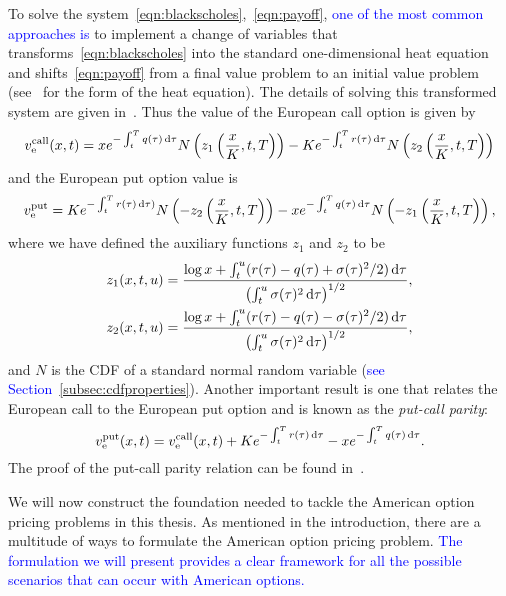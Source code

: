 To solve the system~\eqref{eqn:blackscholes},~\eqref{eqn:payoff}, \textcolor{blue}{one of the most common approaches is} to implement a change of variables that transforms~\eqref{eqn:blackscholes} into the standard one-dimensional heat equation and shifts~\eqref{eqn:payoff} from a final value problem to an initial value problem (see~\cite{cannon1984one} for the form of the heat equation).
The details of solving this transformed system are given in~\cite{Wilmott1995}. Thus the value of the European call option is given by
	\begin{equation}
		\label{eqn:EUcall}
			v_{\text{e}}^{\text{call}}(x,t) = xe^{-\int_t^T q(\tau) \, \mathrm d\tau} N\left(z_1\left( \frac{x}{K}, t, T \right)\right) - K e^{-\int_t^T r(\tau) \, \mathrm d\tau} N\left(z_2\left( \frac{x}{K}, t, T \right)\right)
		\end{equation}
and the European put option value is
	\begin{equation}
		\label{eqn:EUput}
		v_{\text{e}}^{\text{put}} = K e^{-\int_t^T r(\tau) \, \mathrm d\tau) } N\left(-z_2\left( \frac{x}{K}, t, T \right)\right) - xe^{-\int_t^T q(\tau) \, \mathrm d\tau} N\left(-z_1\left( \frac{x}{K}, t, T \right)\right),
	\end{equation}
where we have defined the auxiliary functions $z_1$ and $z_2$ to be
	\begin{align}
		z_1(x,t,u) & = \frac{\log x + \int_t^u (r(\tau) - q(\tau) + \sigma(\tau)^2/2) \, \mathrm d\tau}{\left(\int_t^u \sigma(\tau)^2 \, \mathrm d\tau\right)^{1/2}}, \label{eqn:z1}\\
		z_2(x,t,u) & = \frac{\log x + \int_t^u (r(\tau) - q(\tau) - \sigma(\tau)^2/2) \, \mathrm d\tau}{\left(\int_t^u \sigma(\tau)^2 \, \mathrm d\tau\right)^{1/2}} \label{eqn:z2},
	\end{align}
and $N$ is the CDF of a standard normal random variable (\textcolor{blue}{see Section~\ref{subsec:cdfproperties}}). Another important result is one that relates the European call to the European put option and is known as the \emph{put-call parity}:
	\begin{equation}
		\label{eqn:pcp}
		v_\text{e}^{\text{put}}(x,t) = v_\text{e}^{\text{call}}(x,t) + Ke^{-\int_t^T r(\tau) \, \mathrm d\tau} - xe^{-\int_t^T q(\tau) \, \mathrm d\tau}.
	\end{equation}
The proof of the put-call parity relation can be found in~\cite{Kwok2008}.

We will now construct the foundation needed to tackle the American option pricing problems in this thesis.
As mentioned in the introduction, there are a multitude of ways to formulate the American option pricing problem. \textcolor{blue}{The formulation we will present provides a clear framework for all the possible scenarios that can occur with American options.}

